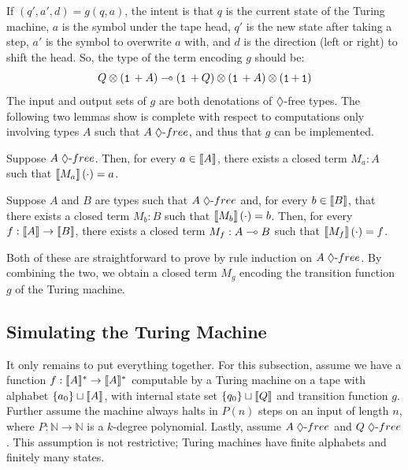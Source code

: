 If $(q', a', d) = g(q, a)$, the intent is that $q$ is the current state of the Turing machine, $a$ is the symbol under the tape head, $q'$ is the new state after taking a step, $a'$ is the symbol to overwrite $a$ with, and $d$ is the direction (left or right) to shift the head. So, the type of the \lfpl term encoding $g$ should be:
\[ \tparr{\tptens{Q}{(\tpsum{\tpunit{}}{A})}}{\tptens{(\tpsum{\tpunit{}}{Q})}{\tptens{(\tpsum{\tpunit{}}{A})}{(\tpsum{\tpunit}{\tpunit})}}} \]
The input and output sets of $g$ are both denotations of $\tpdiam$-free types. The following two lemmas show \lfpl is complete with respect to computations only involving types $A$ such that $\dfree{A}$, and thus that $g$ can be implemented.

\begin{lemma}
Suppose $\dfree{A}$. Then, for every $a \in \llbracket A \rrbracket$, there exists a closed term $M_a : A$ such that ${\llbracket M_a \rrbracket}\left(\cdot\right) = a$.
\end{lemma}

\begin{lemma}
Suppose $A$ and $B$ are types such that $\dfree{A}$ and, for every $b \in \llbracket B \rrbracket$, that there exists a closed term $M_b : B$ such that ${\llbracket M_b \rrbracket}\left(\cdot\right) = b$. Then, for every $f : \llbracket A \rrbracket \to \llbracket B \rrbracket$, there exists a closed term $M_f : \tparr{A}{B}$ such that ${\llbracket M_f \rrbracket}\left(\cdot\right) = f$.
\end{lemma}
Both of these are straightforward to prove by rule induction on $\dfree{A}$. By combining the two, we obtain a closed term $M_g$ encoding the transition function $g$ of the Turing machine.



\subsection{Simulating the Turing Machine}
\label{sec:completeness-general-thm}
\enlargethispage{\baselineskip}

It only remains to put everything together. For this subsection, assume we have a function $f : \llbracket A \rrbracket^* \to \llbracket A \rrbracket^*$ computable by a Turing machine on a tape with alphabet $\{a_0\} \sqcup \llbracket A \rrbracket$, with internal state set $\{q_0\} \sqcup \llbracket Q \rrbracket$ and transition function $g$. Further assume the machine always halts in $P(n)$ steps on an input of length $n$, where $P : \mathbb N \to \mathbb N$ is a $k$-degree polynomial. Lastly, assume $\dfree{A}$ and $\dfree{Q}$. This assumption is not restrictive; Turing machines have finite alphabets and finitely many states.

